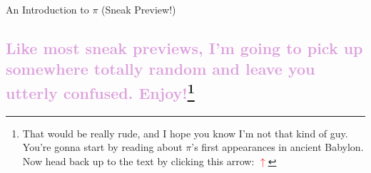 \documentclass[11pt,titlepage]{article}
\begin{document}
\begin{comment}
I'm also quite indebted to Dr. Greg Moore, who taught my History of Math course and who was the first to show me how much more there is to math than the equations we learn in class. 

Shout out to Jaime Knoch \textcolor{red}{OTHER NAMES} who took the time to help me edit. I would be foolish to think that I could write this whole thing without some help, and I'm happy to say that these are some of the smartest and most helpful folks I've ever come across. Thanks for all the late night shenanigans and giggles. Despite this, there are probably finicky mistakes that have gone unnoticed, and do not hesitate to alert me if you notice anything gone awry!

Of course, as always, I need to thank the two all-time great people who have inspired me with just about everything I do: Charles Babbage and Kanye West, you guys rock. 
\\ \\
\indent
Anyway, that's enough from me. Now it's time to dust off your spectacles, sharpen your quill, and massage that noggin, because it's learning time. Let's get started! 
\\ \\
-- Matthew Jordan, September 2014  

\newpage 

\tableofcontents

\newpage
\end{comment}
\begin{center}
{\huge An Introduction to $\pi$ (Sneak Preview!)}
\end{center}
\subsection*{\label{preview}\textcolor{Plum}{Like most sneak previews, I'm going to pick up somewhere totally random and leave you utterly confused. Enjoy!}\footnote{That would be really rude, and I hope you know I'm not that kind of guy. You're gonna start by reading about $\pi$'s first appearances in ancient Babylon. Now head back up to the text by clicking this arrow: \hyperref[preview]{\textbf{\textcolor{red}{$\uparrow$}}}}}
\end{document}
